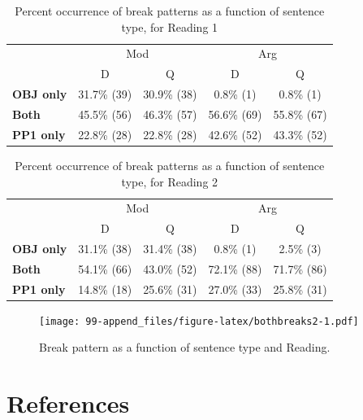 \documentclass[11pt,oneside]{book}
\begin{document}
\centering

\begin{table}[!h]

\caption{\label{tab:r1bothbreaks}Percent occurrence of break patterns as a function of sentence type, for Reading 1}
\centering
\begin{tabular}{>{\bfseries}lcccc}
\toprule
\multicolumn{1}{c}{ } & \multicolumn{2}{c}{Mod} & \multicolumn{2}{c}{Arg} \\
\cmidrule(l{3pt}r{3pt}){2-3} \cmidrule(l{3pt}r{3pt}){4-5}
  & D & Q & D & Q\\
\midrule
OBJ only & 31.7\% (39) & 30.9\% (38) & 0.8\% (1) & 0.8\% (1)\\
Both & 45.5\% (56) & 46.3\% (57) & 56.6\% (69) & 55.8\% (67)\\
PP1 only & 22.8\% (28) & 22.8\% (28) & 42.6\% (52) & 43.3\% (52)\\
\bottomrule
\end{tabular}
\end{table}

\begin{table}[!h]

\caption{\label{tab:r2bothbreaks}Percent occurrence of break patterns as a function of sentence type, for Reading 2}
\centering
\begin{tabular}{>{\bfseries}lcccc}
\toprule
\multicolumn{1}{c}{ } & \multicolumn{2}{c}{Mod} & \multicolumn{2}{c}{Arg} \\
\cmidrule(l{3pt}r{3pt}){2-3} \cmidrule(l{3pt}r{3pt}){4-5}
  & D & Q & D & Q\\
\midrule
OBJ only & 31.1\% (38) & 31.4\% (38) & 0.8\% (1) & 2.5\% (3)\\
Both & 54.1\% (66) & 43.0\% (52) & 72.1\% (88) & 71.7\% (86)\\
PP1 only & 14.8\% (18) & 25.6\% (31) & 27.0\% (33) & 25.8\% (31)\\
\bottomrule
\end{tabular}
\end{table}

\begin{figure}
\centering
\texttt{[image: 99-append\_files/figure-latex/bothbreaks2-1.pdf]}
\caption{\label{fig:bothbreaks2}Break pattern as a function of sentence type and Reading.}
\end{figure}

\hypertarget{references}{%
\chapter*{References}\label{references}}
\end{document}
